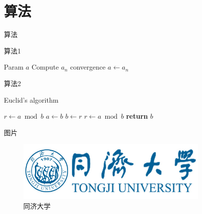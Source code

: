 \documentclass[hyperref,UTF8,10pt]{beamer}
\numberwithin{equation}{section} %
\begin{document}

\section{算法}

\begin{frame}{算法}
    \begin{algorithm}[H]
        \caption{算法1}\label{alg:em}
        \begin{algorithmic}[1]
            \Require Param
            \Ensure $a$
            \Repeat
            \State Compute $a_n$
            \Until convergence
            \Return $a\leftarrow a_n$
        \end{algorithmic}
    \end{algorithm} 
\end{frame}

\begin{frame}{算法2}
    \begin{algorithm}[H]
        \caption{Euclid’s algorithm}\label{alg:euclid}
        \begin{algorithmic}[1] %
        \State $r\gets a\bmod b$
        \State $a\gets b$
        \State $b\gets r$
        \State $r\gets a\bmod b$
        \EndWhile\label{alg:euclidendwhile}
        \State \textbf{return} $b$
        \EndProcedure
        \end{algorithmic}
        \end{algorithm}   
\end{frame}

\begin{frame}{图片}
    \begin{figure}
        \centering
        \includegraphics[width=0.85\textwidth]{tj_logo.jpg}
        \caption{同济大学}\label{fig:tj}
    \end{figure}
\end{frame}
\end{document}
